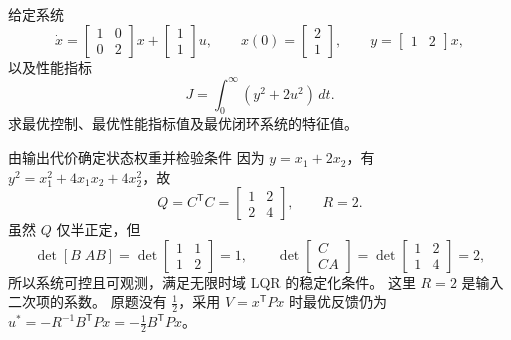 \documentclass[11pt]{article}
\begin{document}
\clearpage
\begin{problem}[原题 5]
给定系统
\[
 \dot x=\begin{bmatrix}1&0\\0&2\end{bmatrix}x
 +\begin{bmatrix}1\\1\end{bmatrix}u,\qquad
 x(0)=\begin{bmatrix}2\\1\end{bmatrix},\qquad
 y=\begin{bmatrix}1&2\end{bmatrix}x,
\]
以及性能指标
\[
 J=\int_0^\infty(y^2+2u^2)\,dt.
\]
求最优控制、最优性能指标值及最优闭环系统的特征值。
\end{problem}
\begin{solution}
\begin{proofstep}{由输出代价确定状态权重并检验条件}
因为 $y=x_1+2x_2$，有 $y^2=x_1^2+4x_1x_2+4x_2^2$，故
\[
 Q=C^{\mathsf T}C=\begin{bmatrix}1&2\\2&4\end{bmatrix},\qquad R=2.
\]
虽然 $Q$ 仅半正定，但
\[
 \det[B\;AB]=\det\begin{bmatrix}1&1\\1&2\end{bmatrix}=1,
 \qquad
 \det\begin{bmatrix}C\\CA\end{bmatrix}
 =\det\begin{bmatrix}1&2\\1&4\end{bmatrix}=2,
\]
所以系统可控且可观测，满足无限时域 LQR 的稳定化条件。
这里 $R=2$ 是输入二次项的系数。
原题没有 $\tfrac12$，采用 $V=x^{\mathsf T}Px$ 时最优反馈仍为
$u^*=-R^{-1}B^{\mathsf T}Px=-\tfrac12 B^{\mathsf T}Px$。
\end{proofstep}


\end{solution}
\end{document}
